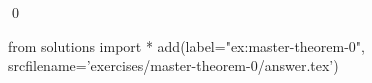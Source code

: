 
\begin{ex} 
  \label{ex:master-theorem-0}
  
  \qed
\end{ex} 
\begin{python0}
from solutions import *
add(label="ex:master-theorem-0",
    srcfilename='exercises/master-theorem-0/answer.tex') 
\end{python0}

